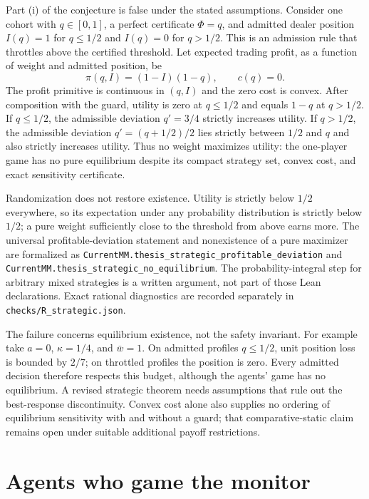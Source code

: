 \begin{remark}\label{rem:strategic_counterexample}
Part (i) of the conjecture is false under the stated assumptions. Consider one cohort with $q\in[0,1]$, a perfect certificate $\Phi=q$, and admitted dealer position $I(q)=1$ for $q\le1/2$ and $I(q)=0$ for $q>1/2$. This is an admission rule that throttles above the certified threshold. Let expected trading profit, as a function of weight and admitted position, be
\[
\pi(q,I)=(1-I)(1-q),\qquad c(q)=0.
\]
The profit primitive is continuous in $(q,I)$ and the zero cost is convex. After composition with the guard, utility is zero at $q\le1/2$ and equals $1-q$ at $q>1/2$. If $q\le1/2$, the admissible deviation $q'=3/4$ strictly increases utility. If $q>1/2$, the admissible deviation $q'=(q+1/2)/2$ lies strictly between $1/2$ and $q$ and also strictly increases utility. Thus no weight maximizes utility: the one-player game has no pure equilibrium despite its compact strategy set, convex cost, and exact sensitivity certificate.

Randomization does not restore existence. Utility is strictly below $1/2$ everywhere, so its expectation under any probability distribution is strictly below $1/2$; a pure weight sufficiently close to the threshold from above earns more. The universal profitable-deviation statement and nonexistence of a pure maximizer are formalized as \nolinkurl{CurrentMM.thesis_strategic_profitable_deviation} and \nolinkurl{CurrentMM.thesis_strategic_no_equilibrium}. The probability-integral step for arbitrary mixed strategies is a written argument, not part of those Lean declarations. Exact rational diagnostics are recorded separately in \texttt{checks/R\_strategic.json}.

The failure concerns equilibrium existence, not the safety invariant. For example take $a=0$, $\kappa=1/4$, and $\bar w=1$. On admitted profiles $q\le1/2$, unit position loss is bounded by $2/7$; on throttled profiles the position is zero. Every admitted decision therefore respects this budget, although the agents' game has no equilibrium. A revised strategic theorem needs assumptions that rule out the best-response discontinuity. Convex cost alone also supplies no ordering of equilibrium sensitivity with and without a guard; that comparative-static claim remains open under suitable additional payoff restrictions.
\end{remark}

\section{Agents who game the monitor}\label{sec:bl_gaming}

